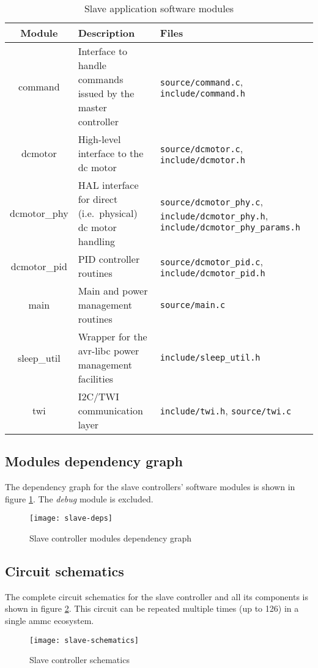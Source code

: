 \begin{table}[ht]
  \begin{tabularx}{\textwidth}{c X X}
    \toprule
    Module & Description & Files \\
    \midrule
    command &
      Interface to handle commands issued by the master controller &
      \texttt{source/command.c},
      \texttt{include/command.h} \\
    dcmotor &
      High-level interface to the dc motor &
      \texttt{source/dcmotor.c},
      \texttt{include/dcmotor.h} \\
    dcmotor\_phy &
      HAL interface for direct (i.e.\ physical) dc motor handling &
      \texttt{source/dcmotor\_phy.c},
      \texttt{include/dcmotor\_phy.h},
      \texttt{include/dcmotor\_phy\_params.h} \\
    dcmotor\_pid &
      PID controller routines &
      \texttt{source/dcmotor\_pid.c},
      \texttt{include/dcmotor\_pid.h} \\
    main &
      Main and power management routines &
      \texttt{source/main.c} \\
    sleep\_util &
      Wrapper for the avr-libc power management facilities &
      \texttt{include/sleep\_util.h} \\
    twi &
      I2C/TWI communication layer &
      \texttt{include/twi.h},
      \texttt{source/twi.c} \\
    \bottomrule
  \end{tabularx}
  \caption{Slave application software modules}
  \label{tab:slave-spec-modules}
\end{table}


\subsection{Modules dependency graph}
The dependency graph for the slave controllers' software modules is shown in
figure \ref{img:slave-deps-graph}. The \emph{debug} module is excluded.
\begin{figure}[ht]
\begin{centering}
  \texttt{[image: slave-deps]}
  \caption{Slave controller modules dependency graph}
  \label{img:slave-deps-graph}
\end{centering}
\end{figure}

\subsection{Circuit schematics}
The complete circuit schematics for the slave controller and all its components
is shown in figure \ref{img:slave-sch}. This circuit can be repeated multiple
times (up to 126) in a single ammc ecosystem.
\begin{figure}[htb]
\begin{centering}
  \texttt{[image: slave-schematics]}
  \caption{Slave controller schematics}
  \label{img:slave-sch}
\end{centering}
\end{figure}

